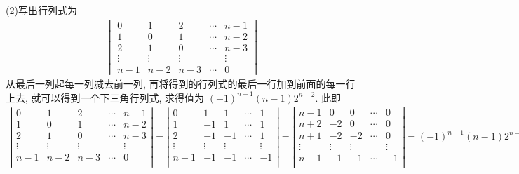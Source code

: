 \documentclass[../../main.tex]{subfiles}
\begin{document}
\begin{solution}
(2)写出行列式为
\begin{align*}
\begin{vmatrix}
0 & 1 & 2 & \cdots & n - 1 \\
1 & 0 & 1 & \cdots & n - 2 \\
2 & 1 & 0 & \cdots & n - 3 \\
\vdots & \vdots & \vdots & & \vdots \\
n - 1 & n - 2 & n - 3 & \cdots & 0
\end{vmatrix}
\end{align*}
从最后一列起每一列减去前一列, 再将得到的行列式的最后一行加到前面的每一行上去, 就可以得到一个下三角行列式, 求得值为 \((-1)^{n - 1}(n - 1)2^{n - 2}\). 此即
\begin{align*}
\left| \begin{matrix}
0&		1&		2&		\cdots&		n-1\\
1&		0&		1&		\cdots&		n-2\\
2&		1&		0&		\cdots&		n-3\\
\vdots&		\vdots&		\vdots&		&		\vdots\\
n-1&		n-2&		n-3&		\cdots&		0\\
\end{matrix} \right|=\left| \begin{matrix}
0&		1&		1&		\cdots&		1\\
1&		-1&		1&		\cdots&		1\\
2&		-1&		-1&		\cdots&		1\\
\vdots&		\vdots&		\vdots&		&		\vdots\\
n-1&		-1&		-1&		\cdots&		-1\\
\end{matrix} \right|=\left| \begin{matrix}
n-1&		0&		0&		\cdots&		0\\
n+2&		-2&		0&		\cdots&		0\\
n+1&		-2&		-2&		\cdots&		0\\
\vdots&		\vdots&		\vdots&		&		\vdots\\
n-1&		-1&		-1&		\cdots&		-1\\
\end{matrix} \right|=\left( -1 \right) ^{n-1}\left( n-1 \right) 2^{n-2}.
\end{align*}
\end{solution}
\end{document}
